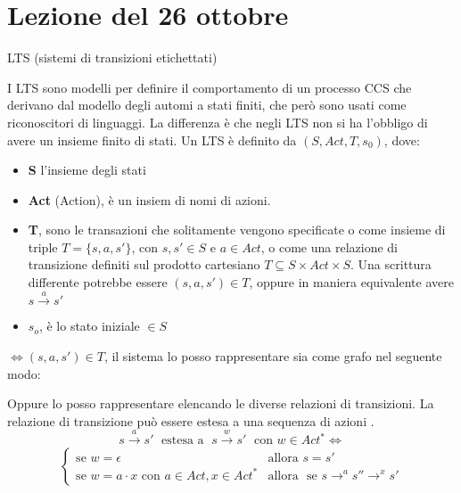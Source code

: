 \section{Lezione del 26 ottobre}
LTS (sistemi di transizioni etichettati)

I LTS sono modelli per definire il comportamento di un processo CCS che derivano dal modello degli automi a stati finiti, che però sono usati come riconoscitori di linguaggi. La differenza è che negli LTS non si ha l'obbligo di avere un insieme finito di stati. 
Un LTS è definito da $(S, Act, T, s_0)$, dove:
\begin{itemize}
    \item \textbf{S} l'insieme degli stati
    \item \textbf{Act} (Action), è un insiem di nomi di azioni.
    \item \textbf{T}, sono le transazioni che solitamente vengono specificate o come insieme di triple $T = \{s,a,s'\}$, con $s,s' \in S$ e $a \in Act$, o come una relazione di transizione definiti sul prodotto cartesiano $T \subseteq S \times Act \times S$. Una scrittura differente potrebbe essere $(s,a,s') \in T$, oppure in maniera equivalente avere $s \stackrel{a} \to s'$
    \item $s_o$, è lo stato iniziale $\in S$
\end{itemize}
$\iff (s,a,s') \in T  $, il sistema lo posso rappresentare sia come grafo nel seguente modo: 

{\centering
    
\par
} 

Oppure lo posso rappresentare elencando le diverse relazioni di transizioni. La relazione di transizione può essere estesa a una sequenza di azioni .
$$
s \stackrel{a}\to s' \; \text{ estesa a } \; s \stackrel{w}\to s' \; \text{ con } w \in Act^*
\iff 
$$
\begin{align*}
    \begin{cases} 
        \text{se } w=\epsilon & \text{allora }  s=s' \\
        \text{se } w=a \cdot x  \text{ con } a \in Act, x \in Act^*  & \text{allora } \text{ se } s \to^a s'' \to^x s'
    \end{cases}
\end{align*}

